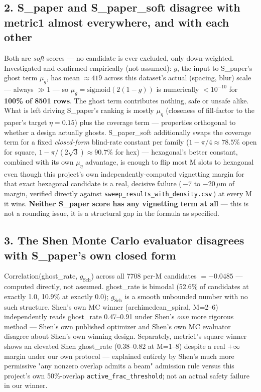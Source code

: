\documentclass[10pt]{article}
\begin{document}
\subsection*{2. S\_paper and S\_paper\_soft disagree with metric1 almost everywhere, and with each other}
Both are \emph{soft} scores — no candidate is ever excluded, only down-weighted. Investigated and
confirmed empirically (not assumed): $g$, the input to S\_paper's ghost term $\mu_g$, has
mean $\approx 419$ across this dataset's actual (spacing, blur) scale — always $\gg 1$ — so
$\mu_g=\text{sigmoid}(2(1-g))$ is numerically $<10^{-10}$ for \textbf{100\% of 8501 rows}. The
ghost term contributes nothing, safe or unsafe alike. What is left driving S\_paper's ranking is
mostly $\mu_\eta$ (closeness of fill-factor to the paper's target $\eta=0.15$) plus the coverage
term — properties orthogonal to whether a design actually ghosts. S\_paper\_soft additionally
swaps the coverage term for a fixed \emph{closed-form} blind-rate constant per family
($1-\pi/4\approx78.5\%$ open for square, $1-\pi/(2\sqrt3)\approx90.7\%$ for hex) — hexagonal's
better constant, combined with its own $\mu_\eta$ advantage, is enough to flip most M slots to
hexagonal even though this project's own independently-computed vignetting margin for that exact
hexagonal candidate is a real, decisive failure (\,$-7$ to $-20\,\mu$m of margin, verified directly
against \texttt{sweep\_results\_with\_density.csv}\,) at every M it wins. \textbf{Neither S\_paper
score has any vignetting term at all} — this is not a rounding issue, it is a structural gap in
the formula as specified.

\subsection*{3. The Shen Monte Carlo evaluator disagrees with S\_paper's own closed form}
Correlation(ghost\_rate, $g_\text{Sch}$) across all 7708 per-M candidates $= -0.0485$ — computed
directly, not assumed. ghost\_rate is bimodal (52.6\% of candidates at exactly 1.0, 10.9\% at
exactly 0.0); $g_\text{Sch}$ is a smooth unbounded number with no such structure. Shen's own MC
winner (archimedean\_spiral, M=2--6) independently reads ghost\_rate 0.47--0.91 under Shen's
\emph{own} more rigorous method — Shen's own published optimizer and Shen's own MC evaluator
disagree about Shen's own winning design. Separately, metric1's square winner shows an elevated
Shen ghost\_rate (0.38--0.82 at M=1--8) despite a real $+\infty$ margin under our own protocol —
explained entirely by Shen's much more permissive "any nonzero overlap admits a beam" admission
rule versus this project's own 50\%-overlap \texttt{active\_frac\_threshold}; not an actual safety
failure in our winner.
\end{document}
